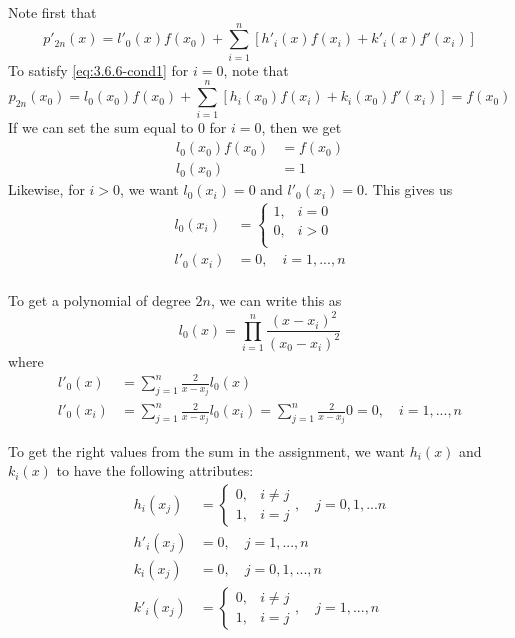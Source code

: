 Note first that
\begin{equation*}
    p'_{2n}(x) = l'_0(x) f(x_0) + \sum_{i=1}^n \left[ h'_i(x)f(x_i) + k'_i(x)f'(x_i) \right]
\end{equation*}
To satisfy \eqref{eq:3.6.6-cond1} for $i = 0$, note that
\begin{equation*}
    p_{2n}(x_0) = l_0(x_0) f(x_0) + \sum_{i=1}^n \left[ h_i(x_0)f(x_i) + k_i(x_0)f'(x_i) \right] = f(x_0)
\end{equation*}
If we can set the sum equal to 0 for $i = 0$, then we get
\begin{align*}
    l_0 (x_0) f(x_0) &= f(x_0) \\
    l_0 (x_0) &= 1
\end{align*}
Likewise, for $i > 0$, we want $l_0(x_i) = 0$ and $l'_0(x_i) = 0$. This gives us
\begin{align*}
    l_0(x_i) &= \begin{cases}
        1, & i = 0 \\
        0, & i > 0 \\
    \end{cases} \\
    l'_0(x_i) &= 0, \quad i = 1, ..., n \\
\end{align*}

To get a polynomial of degree $2n$, we can write this as
\begin{equation*}
    l_0(x) = \prod_{i = 1}^n \frac{\left( x - x_i \right)^2}{\left( x_0 - x_i \right)^2}
\end{equation*}
where
\begin{align*}
    l'_0(x) &= \sum_{j = 1}^n \frac{2}{x - x_j} l_0(x) \\
    l'_0(x_i) &= \sum_{j = 1}^n \frac{2}{x - x_j} l_0(x_i) = \sum_{j = 1}^n \frac{2}{x - x_j} 0 = 0, \quad i = 1, ..., n
\end{align*}

To get the right values from the sum in the assignment, we want $h_i(x)$ and $k_i(x)$ to have the following attributes:
\begin{align*}
    h_i(x_j) &= \begin{cases}
        0, & i \ne j \\
        1, & i = j
    \end{cases}, \quad j = 0, 1, ... n \\
    h'_i(x_j) &= 0, \quad j = 1, ..., n \\
    k_i(x_j) &= 0, \quad j = 0, 1, ..., n \\
    k'_i(x_j) &= \begin{cases}
        0, & i \ne j \\
        1, & i = j
    \end{cases}, \quad j = 1, ..., n \\
\end{align*}

